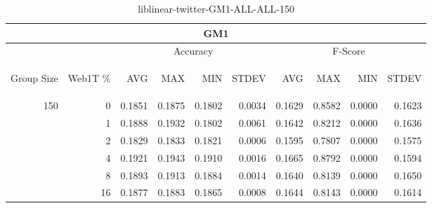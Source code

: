 \begin{center}
\begin{table}[htbp]
\begin{tabular}{ | r | r | r | r | r | r | r | r | r | r |}
\hline
\multicolumn{10}{|c|}{GM1}\\
\hline
 & & \multicolumn{4}{|c|}{Accuracy} & \multicolumn{4}{|c|}{F-Score}\\ \cline{3-10}
\begin{sideways}Group Size\end{sideways} & \begin{sideways}Web1T \%\end{sideways} & \begin{sideways}AVG\end{sideways} & \begin{sideways}MAX\end{sideways} & \begin{sideways}MIN\end{sideways} & \begin{sideways}STDEV\end{sideways} & \begin{sideways}AVG\end{sideways} & \begin{sideways}MAX\end{sideways} & \begin{sideways}MIN\end{sideways} & \begin{sideways}STDEV\end{sideways}\\
\hline
\multirow{6}{*}{150}
 & 0 & 0.1851 & 0.1875 & 0.1802 & 0.0034 & 0.1629 & 0.8582 & 0.0000 & 0.1623\\ \cline{2-10}
 & 1 & 0.1888 & 0.1932 & 0.1802 & 0.0061 & 0.1642 & 0.8212 & 0.0000 & 0.1636\\ \cline{2-10}
 & 2 & 0.1829 & 0.1833 & 0.1821 & 0.0006 & 0.1595 & 0.7807 & 0.0000 & 0.1575\\ \cline{2-10}
 & 4 & 0.1921 & 0.1943 & 0.1910 & 0.0016 & 0.1665 & 0.8792 & 0.0000 & 0.1594\\ \cline{2-10}
 & 8 & 0.1893 & 0.1913 & 0.1884 & 0.0014 & 0.1640 & 0.8139 & 0.0000 & 0.1650\\ \cline{2-10}
 & 16 & 0.1877 & 0.1883 & 0.1865 & 0.0008 & 0.1644 & 0.8143 & 0.0000 & 0.1614\\ \cline{2-10}
\hline
\end{tabular}
\caption{liblinear-twitter-GM1-ALL-ALL-150}
\end{table}
\end{center}

